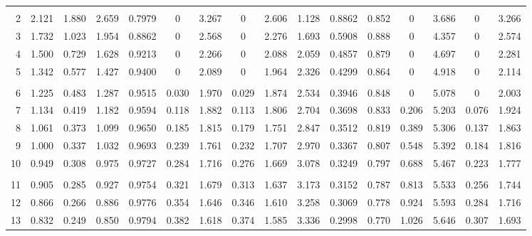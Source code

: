 \documentclass{article}
\begin{document}
\begin{center}
\begin{tabular}{|r|c|c|c|c|c|c|c|c|c|c|c|c|c|c|c|}
       &       &        &       &       &       &       &       &
       &       &        &       &       &       &       &       \\
     2 & 2.121 & 1.880 & 2.659 & 0.7979 &   0   & 3.267 &   0   & 2.606
       & 1.128 & 0.8862 & 0.852 &   0   & 3.686 &   0   & 3.266 \\
     3 & 1.732 & 1.023 & 1.954 & 0.8862 &   0   & 2.568 &   0   & 2.276
       & 1.693 & 0.5908 & 0.888 &   0   & 4.357 &   0   & 2.574 \\
     4 & 1.500 & 0.729 & 1.628 & 0.9213 &   0   & 2.266 &   0   & 2.088
       & 2.059 & 0.4857 & 0.879 &   0   & 4.697 &   0   & 2.281 \\
     5 & 1.342 & 0.577 & 1.427 & 0.9400 &   0   & 2.089 &   0   & 1.964
       & 2.326 & 0.4299 & 0.864 &   0   & 4.918 &   0   & 2.114 \\
       &       &        &       &       &       &       &       &
       &       &        &       &       &       &       &       \\
     6 & 1.225 & 0.483 & 1.287 & 0.9515 & 0.030 & 1.970 & 0.029 & 1.874
       & 2.534 & 0.3946 & 0.848 &   0   & 5.078 &   0   & 2.003 \\
     7 & 1.134 & 0.419 & 1.182 & 0.9594 & 0.118 & 1.882 & 0.113 & 1.806
       & 2.704 & 0.3698 & 0.833 & 0.206 & 5.203 & 0.076 & 1.924 \\
     8 & 1.061 & 0.373 & 1.099 & 0.9650 & 0.185 & 1.815 & 0.179 & 1.751
       & 2.847 & 0.3512 & 0.819 & 0.389 & 5.306 & 0.137 & 1.863 \\
     9 & 1.000 & 0.337 & 1.032 & 0.9693 & 0.239 & 1.761 & 0.232 & 1.707
       & 2.970 & 0.3367 & 0.807 & 0.548 & 5.392 & 0.184 & 1.816 \\
    10 & 0.949 & 0.308 & 0.975 & 0.9727 & 0.284 & 1.716 & 0.276 & 1.669
       & 3.078 & 0.3249 & 0.797 & 0.688 & 5.467 & 0.223 & 1.777 \\
       &       &        &       &       &       &       &       &
       &       &        &       &       &       &       &       \\
    11 & 0.905 & 0.285 & 0.927 & 0.9754 & 0.321 & 1.679 & 0.313 & 1.637
       & 3.173 & 0.3152 & 0.787 & 0.813 & 5.533 & 0.256 & 1.744 \\
    12 & 0.866 & 0.266 & 0.886 & 0.9776 & 0.354 & 1.646 & 0.346 & 1.610
       & 3.258 & 0.3069 & 0.778 & 0.924 & 5.593 & 0.284 & 1.716 \\
    13 & 0.832 & 0.249 & 0.850 & 0.9794 & 0.382 & 1.618 & 0.374 & 1.585
       & 3.336 & 0.2998 & 0.770 & 1.026 & 5.646 & 0.307 & 1.693 \\

\end{tabular}
\end{center}
\end{document}
